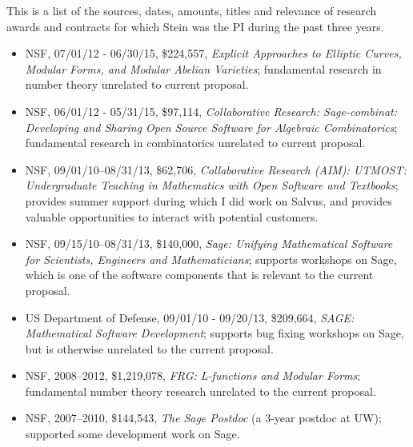 \documentclass[11pt]{article}
\begin{document}
\mbox{}

This is a list of the sources, dates, amounts, titles and relevance of
research awards and contracts for which Stein was the PI during the
past three years.

\begin{itemize}\setlength{\itemsep}{0ex}

\item NSF, 07/01/12 - 06/30/15, \$224,557, {\em Explicit Approaches to Elliptic Curves, Modular Forms, and Modular Abelian Varieties}; fundamental research in number theory unrelated to current proposal.
\item NSF, 06/01/12 - 05/31/15, \$97,114, {\em Collaborative Research: Sage-combinat: Developing and Sharing Open Source Software for Algebraic Combinatorics}; fundamental research in combinatorics unrelated to current proposal.
\item NSF, 09/01/10--08/31/13, \$62,706, {\em
  Collaborative Research (AIM): UTMOST: Undergraduate Teaching in
  Mathematics with Open Software and Textbooks}; provides summer support during which I did work on Salvus, and provides valuable opportunities to interact with potential customers.
\item NSF, 09/15/10--08/31/13, \$140,000, {\em Sage: Unifying Mathematical Software for Scientists, Engineers and Mathematicians}; supports workshops on Sage, which is one of the software components that is relevant to the current proposal.
\item US Department of Defense, 09/01/10 - 09/20/13, \$209,664, {\em
  SAGE: Mathematical Software Development}; supports bug fixing workshops on Sage, but is otherwise unrelated to the current proposal.
\item NSF, 2008--2012, \$1,219,078, {\em FRG: L-functions and Modular Forms}; fundamental number theory research unrelated to the current proposal.
\item NSF, 2007--2010, \$144,543, 
  {\em The Sage Postdoc} (a 3-year postdoc at UW); supported some development work on Sage.



\end{itemize}
\end{document}
